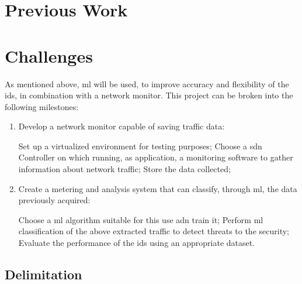 
\section{Previous Work}
\label{sec:prev-work}

\textcolor{dimgray}{\lipsum[1]}


\section{Challenges}
\label{sec:objectives}

As mentioned above, \gls{ml} will be used, to improve accuracy and flexibility of the \gls{ids}, in combination with a network monitor. This project can be broken into the following milestones:

\begin{enumerate}
    \item Develop a network monitor capable of saving traffic data:
    \begin{itemize}
        \itemAR Set up a virtualized environment for testing purposes;
        \itemAR Choose a \gls{sdn} Controller on which running, as application, a monitoring software to gather information about network traffic;
        \itemAR Store the data collected;
    \end{itemize}
    \item Create a metering and analysis system that can classify, through \gls{ml}, the data previously acquired:
    \begin{itemize}
        \itemAR Choose a \gls{ml} algorithm suitable for this use adn train it;
        \itemAR Perform \gls{ml} classification of the above extracted traffic to detect threats to the security;
        \itemAR Evaluate the performance of the \gls{ids} using an appropriate dataset.
    \end{itemize}
\end{enumerate}


\subsection{Delimitation}
\label{subsec:delimitation}

